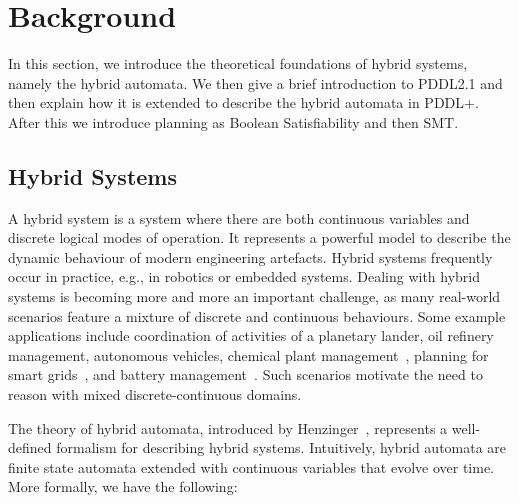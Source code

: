 \section{Background}\label{sec:background}

In this section, we introduce the theoretical foundations of hybrid systems, namely the hybrid automata. We then give a brief introduction to PDDL2.1 and then explain how it is extended to describe the hybrid automata in PDDL+. After this we introduce planning as Boolean Satisfiability and then SMT.

\subsection{Hybrid Systems}

A hybrid system is a system where there are both continuous variables and discrete logical modes of operation. It represents a powerful model to describe the dynamic behaviour of modern engineering artefacts. Hybrid systems frequently occur in practice, e.g., in robotics or embedded systems. Dealing with hybrid systems is becoming more and more an important challenge, as many real-world scenarios feature a mixture of discrete and continuous behaviours. Some example applications include coordination of activities of a planetary lander, oil refinery management, autonomous vehicles, chemical plant management~\cite{chemical}, planning for smart grids~\cite{ucp}, and battery management~\cite{battery}. Such scenarios motivate the need to reason with mixed discrete-continuous domains.

The theory of hybrid automata, introduced by Henzinger~\cite{henzinger}, represents a well-defined formalism for describing hybrid systems. Intuitively, hybrid automata are finite state automata extended with continuous variables that evolve over time. More formally, we have the following:

